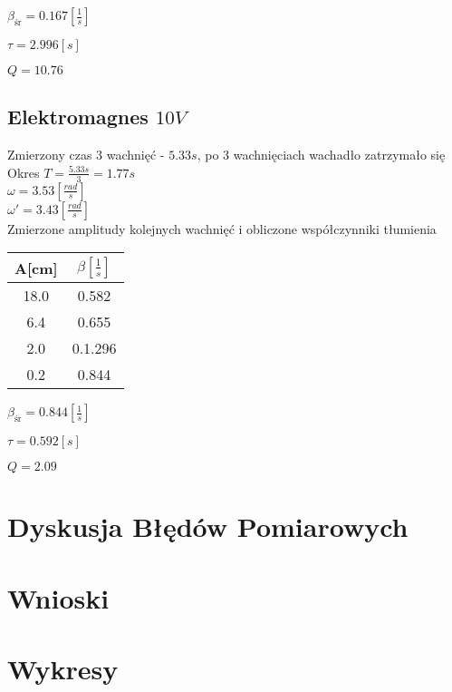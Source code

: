 \documentclass[]{article}
\begin{document}
	$\beta_{\text{śr}} = 0.167 \left[ \frac{1}{s}\right] $
	
	$\tau=2.996[s]$
	
	$Q = 10.76$
	
	\subsection{Elektromagnes $10V$}
	Zmierzony czas 3 wachnięć - $5.33s$, po 3 wachnięciach wachadło zatrzymało się\\
	Okres $T=\frac{5.33s}{3} = 1.77s$\\
	$\omega = 3.53 \left[ \frac{rad}{s}\right]$\\
	$\omega' = 3.43 \left[ \frac{rad}{s}\right]$\\
	Zmierzone amplitudy kolejnych wachnięć i obliczone współczynniki tłumienia
	\begin{table}[h]
		\begin{tabular}{|c|c|}
			\hline 
			A[cm] & $\beta\left[ \frac{1}{s}\right] $ \\ 
			\hline 
			18.0 & 0.582 \\ 
			\hline 
			6.4 & 0.655 \\ 
			\hline 
			2.0 & 0.1.296 \\ 
			\hline 
			0.2 & 0.844 \\ 
			\hline 
		\end{tabular} 
	\end{table}
	
	$\beta_{\text{śr}} = 0.844 \left[ \frac{1}{s}\right] $
	
	$\tau=0.592[s]$
	
	$Q = 2.09$
	\section{Dyskusja Błędów Pomiarowych}
	\section{Wnioski}
	\section{Wykresy}
\end{document}
